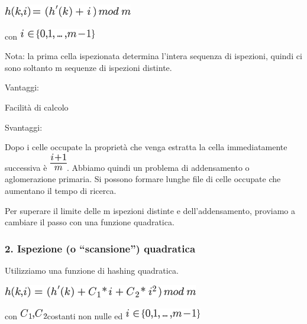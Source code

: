 \documentclass{article}
\begin{document}
{}

\includegraphics{images/image287.png}

{con }\includegraphics{images/image288.png}

{}

{Nota: la prima cella ispezionata determina l'intera sequenza di
ispezioni, }{quindi ci sono soltanto m sequenze di ispezioni distinte.}

{Vantaggi}{: }

{Facilità di calcolo}

{Svantaggi}{: }

{Dopo }{i }{celle occupate la proprietà che venga estratta la cella
immediatamente successiva è }\includegraphics{images/image289.png}{.
Abbiamo quindi un problema di }{addensamento o aglomerazione primaria}{.
Si possono formare lunghe file di celle occupate che aumentano il tempo
di ricerca.}

{}

{Per superare il limite delle m ispezioni distinte e dell'addensamento,
proviamo a cambiare il passo con una funzione quadratica.}

\hypertarget{h.83xwipol2nwy}{\subsubsection{\texorpdfstring{{2.
Ispezione (o ``scansione'')
quadratica}}{2. Ispezione (o scansione) quadratica}}\label{h.83xwipol2nwy}}

{Utilizziamo una funzione di hashing quadratica.}

\includegraphics{images/image290.png}

{con }\includegraphics{images/image291.png}{costanti non nulle ed
}\includegraphics{images/image288.png}
\end{document}
